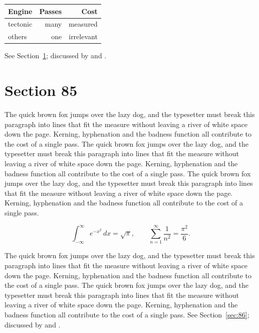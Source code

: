\documentclass{article}
\begin{document}
\begin{center}
\begin{tabular}{lrr}
\toprule
Engine & Passes & Cost \\
\midrule
tectonic & many & measured \\
others & one & irrelevant \\
\bottomrule
\end{tabular}
\end{center}

See Section~\ref{sec:85}; discussed by \textcite{k5} and \textcite{l2}.
\section{Section 85}
\label{sec:85}
The quick brown fox jumps over the lazy dog, and the typesetter must break this paragraph into lines that fit the measure without leaving a river of white space down the page. Kerning, hyphenation and the badness function all contribute to the cost of a single pass. The quick brown fox jumps over the lazy dog, and the typesetter must break this paragraph into lines that fit the measure without leaving a river of white space down the page. Kerning, hyphenation and the badness function all contribute to the cost of a single pass. The quick brown fox jumps over the lazy dog, and the typesetter must break this paragraph into lines that fit the measure without leaving a river of white space down the page. Kerning, hyphenation and the badness function all contribute to the cost of a single pass. 

\begin{equation}\label{eq:85}
\int_{-\infty}^{\infty} e^{-x^{2}}\,dx = \sqrt{\pi}, \qquad
\sum_{n=1}^{\infty} \frac{1}{n^{2}} = \frac{\pi^{2}}{6}.
\end{equation}

The quick brown fox jumps over the lazy dog, and the typesetter must break this paragraph into lines that fit the measure without leaving a river of white space down the page. Kerning, hyphenation and the badness function all contribute to the cost of a single pass. The quick brown fox jumps over the lazy dog, and the typesetter must break this paragraph into lines that fit the measure without leaving a river of white space down the page. Kerning, hyphenation and the badness function all contribute to the cost of a single pass. 
See Section~\ref{sec:86}; discussed by \textcite{k1} and \textcite{l3}.
\end{document}
